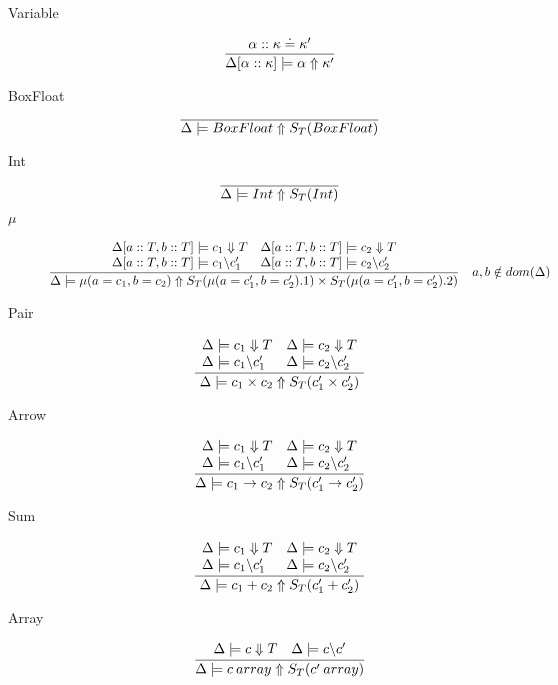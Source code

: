 \documentclass[12pt,twoside,fleqn]{amsart}
\theoremstyle{plain}
\theoremstyle{plain}
\theoremstyle{definition}
\begin{document}
\begin{description}
\item [Variable]
\[
\frac{\alpha  ::\kappa  \doteq \kappa ' }{\Delta [\alpha ::\kappa ] \models \alpha  \Uparrow \kappa ' }\]

\item [BoxFloat]
\[
\overline{\Delta  \models BoxFloat \Uparrow S_{T}(BoxFloat ) }\]

\item [Int]
\[
\overline{\Delta  \models Int \Uparrow S_{T}(Int ) }\]

\item [\( \mu  \)]
\[
\frac{\begin{array}{ll}
\Delta [a::T,b::T] \models c_{1} \Downarrow T & \Delta [a::T,b::T] \models c_{2} \Downarrow T\\
\Delta [a::T,b::T] \models c_{1} \backslash c_{1}' & \Delta [a::T,b::T] \models c_{2} \backslash c_{2}'
\end{array} }{\Delta  \models \mu (a=c_{1},b=c_{2}) \Uparrow S_{T}(\mu (a=c_{1}',b=c_{2}').1 )\times S_{T}(\mu (a=c_{1}',b=c_{2}').2 ) }\quad a,b\notin dom(\Delta )\]
 
\item [Pair]
\[
\frac{\begin{array}{ll}
\Delta  \models c_{1} \Downarrow T & \Delta  \models c_{2} \Downarrow T\\
\Delta  \models c_{1} \backslash c_{1}' & \Delta  \models c_{2} \backslash c_{2}'
\end{array} }{\Delta  \models c_{1}\times c_{2} \Uparrow S_{T}(c_{1}'\times c_{2}' ) }\]

\item [Arrow]
\[
\frac{\begin{array}{ll}
\Delta  \models c_{1} \Downarrow T & \Delta  \models c_{2} \Downarrow T\\
\Delta  \models c_{1} \backslash c_{1}' & \Delta  \models c_{2} \backslash c_{2}'
\end{array} }{\Delta  \models c_{1}\rightarrow c_{2} \Uparrow S_{T}(c_{1}'\rightarrow c_{2}' ) }\]

\item [Sum]
\[
\frac{\begin{array}{ll}
\Delta  \models c_{1} \Downarrow T & \Delta  \models c_{2} \Downarrow T\\
\Delta  \models c_{1} \backslash c_{1}' & \Delta  \models c_{2} \backslash c_{2}'
\end{array} }{\Delta  \models c_{1}+c_{2} \Uparrow S_{T}(c_{1}'+c_{2}' ) }\]

\item [Array]
\[
\frac{\begin{array}{ll}
\Delta  \models c \Downarrow T & \Delta  \models c \backslash c'
\end{array} }{\Delta  \models c \: array \Uparrow S_{T}(c' \: array ) }\]


\end{description}
\end{document}
